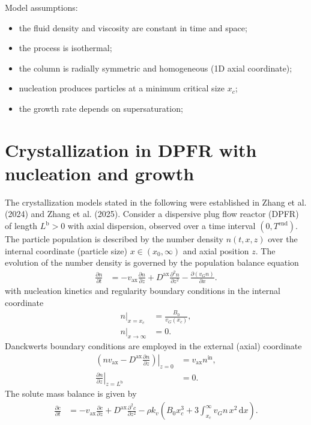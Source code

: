 \documentclass{article}
\begin{document}
Model assumptions:
\begin{itemize}
    \item the fluid density and viscosity are constant in time and space;
    \item the process is isothermal;
    \item the column is radially symmetric and homogeneous (1D axial coordinate);
    \item nucleation produces particles at a minimum critical size $x_{c}$;
    \item the growth rate depends on supersaturation;
\end{itemize}

\section*{Crystallization in DPFR with nucleation and growth}
The crystallization models stated in the following were established in Zhang et al. (2024) and Zhang et al. (2025).
Consider a dispersive plug flow reactor (DPFR) of length $L^{\mathrm{b}} > 0$ with axial dispersion, observed over a time interval $(0, T^{\mathrm{end}})$.
The particle population is described by the number density $n(t, x, z)$ over the internal coordinate (particle size) $x\in(x_{0}, \infty)$ and axial position $z$.
The evolution of the number density is governed by the population balance equation
\begin{align}
    \frac{\partial n}{\partial t}
    &= - v_{\mathrm{ax}} \frac{\partial n}{\partial z}
        + D^{\mathrm{ax}} \frac{\partial^{2} n}{\partial z^{2}}
        - \frac{\partial (v_{G} n)}{\partial x}.
\end{align}
with nucleation kinetics and regularity boundary conditions in the internal coordinate
\begin{align}
    \left. n \right|_{x = x_{c}}
    &= \frac{B_{0}}{v_{G}(x_{c})},
    \\
    \left. n \right|_{x \to \infty}
    &= 0.
\end{align}
Danckwerts boundary conditions are employed in the external (axial) coordinate
\begin{align}
    \left. \left( n v_{\mathrm{ax}} - D^{\mathrm{ax}} \frac{\partial n}{\partial z} \right) \right|_{z=0}
    &= v_{\mathrm{ax}} n^{\mathrm{in}},
    \\
    \left. \frac{\partial n}{\partial z} \right|_{z=L^{\mathrm{b}}}
    &= 0.
\end{align}
The solute mass balance is given by
\begin{align}
    \frac{\partial c}{\partial t}
    &= - v_{\mathrm{ax}} \frac{\partial c}{\partial z}
        + D^{\mathrm{ax}} \frac{\partial^{2} c}{\partial z^{2}}
        - \rho k_{v} \left( B_{0} x_{c}^{3} + 3 \int_{x_{c}}^{\infty} v_{G} n \, x^{2} \, \mathrm{d}x \right).
\end{align}
\end{document}
